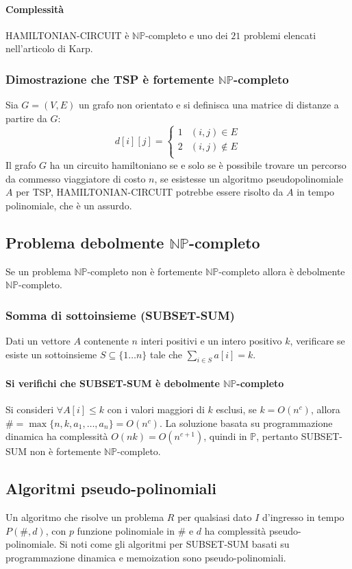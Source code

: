 \paragraph{Complessit\`a}
HAMILTONIAN-CIRCUIT \`e $\mathbb{NP}$-completo e uno dei $21$ problemi elencati nell'articolo di Karp.
\subsubsection{Dimostrazione che TSP \`e fortemente $\mathbf{\mathbb{NP}}$-completo}
Sia $G=(V, E)$ un grafo non orientato e si definisca una matrice di distanze a partire da $G$:
$$d[i][j] = 
\begin{cases}
	1 & (i, j)\in E\\
	2 & (i, j)\not\in E\\
\end{cases}$$
Il grafo $G$ ha un circuito hamiltoniano se e solo se \`e possibile trovare un percorso da commesso viaggiatore di costo $n$, se esistesse un algoritmo pseudopolinomiale $A$ per TSP, 
HAMILTONIAN-CIRCUIT potrebbe essere risolto da $A$ in tempo polinomiale, che \`e un assurdo.
\subsection{Problema debolmente $\mathbf{\mathbb{NP}}$-completo}
Se un problema $\mathbb{NP}$-completo non \`e fortemente $\mathbb{NP}$-completo allora \`e debolmente $\mathbb{NP}$-completo.
\subsubsection{Somma di sottoinsieme (SUBSET-SUM)}
Dati un vettore $A$ contenente $n$ interi positivi e un intero positivo $k$, verificare se esiste un sottoinsieme $S\subseteq\{1\dots n\}$ tale che $\sum\limits_{i\in S}a[i] = k$.
\paragraph{Si verifichi che SUBSET-SUM \`e debolmente $\mathbf{\mathbb{NP}}$-completo}
Si consideri $\forall A[i]\le k$ con i valori maggiori di $k$ esclusi, se $k=O(n^c)$, allora $\# = \max\{n, k, a_1,\dots, a_n\}=O(n^c)$. La soluzione basata su programmazione dinamica
ha complessit\`a $O(nk)=O(n^{c+1})$, quindi in $\mathbb{P}$, pertanto SUBSET-SUM non \`e fortemente $\mathbb{NP}$-completo. 
\subsection{Algoritmi pseudo-polinomiali}
Un algoritmo che risolve un problema $R$ per qualsiasi dato $I$ d'ingresso in tempo $P(\#, d)$, con $p$ funzione polinomiale in $\#$ e $d$ ha complessit\`a pseudo-polinomiale. Si noti
come gli algoritmi per SUBSET-SUM basati su programmazione dinamica e memoization sono pseudo-polinomiali. 
